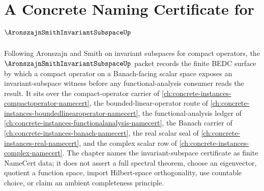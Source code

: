 \chapter{A Concrete Naming Certificate for $\AronszajnSmithInvariantSubspaceUp$}
\label{ch:concrete-instances-aronszajn-smith-invariant-subspace-namecert}

Following Aronszajn and Smith on invariant subspaces for compact operators, the $\AronszajnSmithInvariantSubspaceUp$ packet records the finite BEDC surface by which a compact operator on a Banach-facing scalar space exposes an invariant-subspace witness before any functional-analysis consumer reads the result. It sits over the compact-operator carrier of \autoref{ch:concrete-instances-compactoperator-namecert}, the bounded-linear-operator route of \autoref{ch:concrete-instances-boundedlinearoperator-namecert}, the functional-analysis ledger of \autoref{ch:concrete-instances-functionalanalysis-namecert}, the Banach carrier of \autoref{ch:concrete-instances-banach-namecert}, the real scalar seal of \autoref{ch:concrete-instances-real-namecert}, and the complex scalar row of \autoref{ch:concrete-instances-complex-namecert}. The chapter names the invariant-subspace certificate as finite NameCert data; it does not assert a full spectral theorem, choose an eigenvector, quotient a function space, import Hilbert-space orthogonality, use countable choice, or claim an ambient completeness principle.

